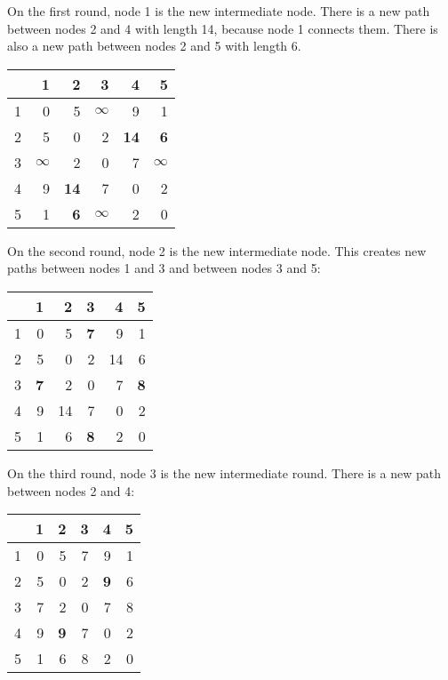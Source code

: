 \documentclass[twoside,12pt,a4paper,english]{book}
\theoremstyle{definition}
\theoremstyle{problemstyle}
\theoremstyle{problemstyle}
\theoremstyle{problemstyle}
\begin{document}
On the first round, node 1 is the new intermediate node.
There is a new path between nodes 2 and 4
with length 14, because node 1 connects them.
There is also a new path 
between nodes 2 and 5 with length 6.

\begin{center}
\begin{tabular}{r|rrrrr}
 & 1 & 2 & 3 & 4 & 5 \\
\hline
1 & 0 & 5 & $\infty$ & 9 & 1 \\
2 & 5 & 0 & 2 & \textbf{14} & \textbf{6} \\
3 & $\infty$ & 2 & 0 & 7 & $\infty$ \\
4 & 9 & \textbf{14} & 7 & 0 & 2 \\
5 & 1 & \textbf{6} & $\infty$ & 2 & 0 \\
\end{tabular}
\end{center}
\vspace{10pt}

On the second round, node 2 is the new intermediate node.
This creates new paths between nodes 1 and 3
and between nodes 3 and 5:

\begin{center}
\begin{tabular}{r|rrrrr}
 & 1 & 2 & 3 & 4 & 5 \\
\hline
1 & 0 & 5 & \textbf{7} & 9 & 1 \\
2 & 5 & 0 & 2 & 14 & 6 \\
3 & \textbf{7} & 2 & 0 & 7 & \textbf{8} \\
4 & 9 & 14 & 7 & 0 & 2 \\
5 & 1 & 6 & \textbf{8} & 2 & 0 \\
\end{tabular}
\end{center}
\vspace{10pt}

On the third round, node 3 is the new intermediate round.
There is a new path between nodes 2 and 4:

\begin{center}
\begin{tabular}{r|rrrrr}
 & 1 & 2 & 3 & 4 & 5 \\
\hline
1 & 0 & 5 & 7 & 9 & 1 \\
2 & 5 & 0 & 2 & \textbf{9} & 6 \\
3 & 7 & 2 & 0 & 7 & 8 \\
4 & 9 & \textbf{9} & 7 & 0 & 2 \\
5 & 1 & 6 & 8 & 2 & 0 \\
\end{tabular}
\end{center}
\vspace{10pt}
\end{document}
